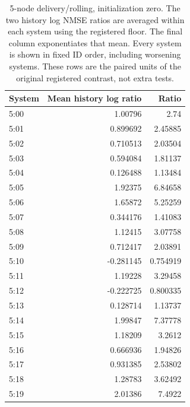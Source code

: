 \clearpage
\begin{table}[ht]
\centering\scriptsize
\begin{tabular}{lrr}
\toprule
System & Mean history log ratio & Ratio\\
\midrule
5:00 & 1.00796 & 2.74\\
5:01 & 0.899692 & 2.45885\\
5:02 & 0.710513 & 2.03504\\
5:03 & 0.594084 & 1.81137\\
5:04 & 0.126488 & 1.13484\\
5:05 & 1.92375 & 6.84658\\
5:06 & 1.65872 & 5.25259\\
5:07 & 0.344176 & 1.41083\\
5:08 & 1.12415 & 3.07758\\
5:09 & 0.712417 & 2.03891\\
5:10 & -0.281145 & 0.754919\\
5:11 & 1.19228 & 3.29458\\
5:12 & -0.222725 & 0.800335\\
5:13 & 0.128714 & 1.13737\\
5:14 & 1.99847 & 7.37778\\
5:15 & 1.18209 & 3.2612\\
5:16 & 0.666936 & 1.94826\\
5:17 & 0.931385 & 2.53802\\
5:18 & 1.28783 & 3.62492\\
5:19 & 2.01386 & 7.4922\\
\bottomrule
\end{tabular}
\caption{5-node delivery/rolling, initialization zero. The two history log NMSE ratios are averaged within each system using the registered floor. The final column exponentiates that mean. Every system is shown in fixed ID order, including worsening systems. These rows are the paired units of the original registered contrast, not extra tests.}
\end{table}
